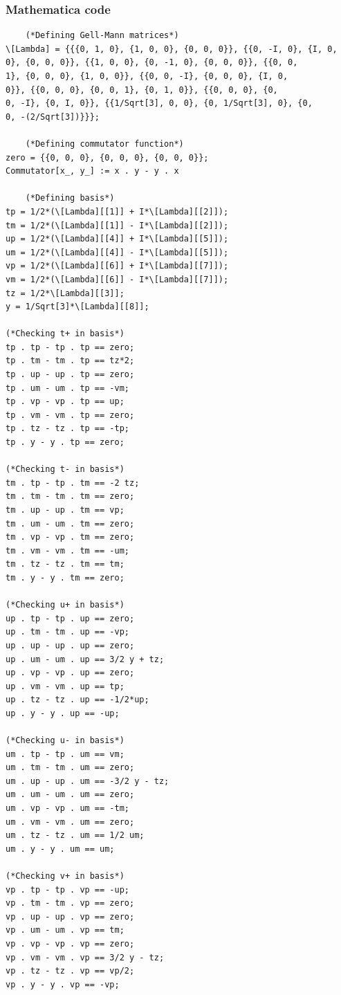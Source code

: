 \documentclass[a4paper,12pt]{article}
\begin{document}
\subsubsection*{Mathematica code}
\begin{lstlisting}
	(*Defining Gell-Mann matrices*)
\[Lambda] = {{{0, 1, 0}, {1, 0, 0}, {0, 0, 0}}, {{0, -I, 0}, {I, 0, 
0}, {0, 0, 0}}, {{1, 0, 0}, {0, -1, 0}, {0, 0, 0}}, {{0, 0, 
1}, {0, 0, 0}, {1, 0, 0}}, {{0, 0, -I}, {0, 0, 0}, {I, 0, 
0}}, {{0, 0, 0}, {0, 0, 1}, {0, 1, 0}}, {{0, 0, 0}, {0, 
0, -I}, {0, I, 0}}, {{1/Sqrt[3], 0, 0}, {0, 1/Sqrt[3], 0}, {0, 
0, -(2/Sqrt[3])}}};
	
	(*Defining commutator function*)
zero = {{0, 0, 0}, {0, 0, 0}, {0, 0, 0}};
Commutator[x_, y_] := x . y - y . x

	(*Defining basis*)
tp = 1/2*(\[Lambda][[1]] + I*\[Lambda][[2]]);
tm = 1/2*(\[Lambda][[1]] - I*\[Lambda][[2]]);
up = 1/2*(\[Lambda][[4]] + I*\[Lambda][[5]]);
um = 1/2*(\[Lambda][[4]] - I*\[Lambda][[5]]);
vp = 1/2*(\[Lambda][[6]] + I*\[Lambda][[7]]);
vm = 1/2*(\[Lambda][[6]] - I*\[Lambda][[7]]);
tz = 1/2*\[Lambda][[3]];
y = 1/Sqrt[3]*\[Lambda][[8]];

(*Checking t+ in basis*)
tp . tp - tp . tp == zero;
tp . tm - tm . tp == tz*2;
tp . up - up . tp == zero;
tp . um - um . tp == -vm;
tp . vp - vp . tp == up;
tp . vm - vm . tp == zero;
tp . tz - tz . tp == -tp;
tp . y - y . tp == zero;

(*Checking t- in basis*)
tm . tp - tp . tm == -2 tz;
tm . tm - tm . tm == zero;
tm . up - up . tm == vp;
tm . um - um . tm == zero;
tm . vp - vp . tm == zero;
tm . vm - vm . tm == -um;
tm . tz - tz . tm == tm;
tm . y - y . tm == zero;

(*Checking u+ in basis*)
up . tp - tp . up == zero;
up . tm - tm . up == -vp;
up . up - up . up == zero;
up . um - um . up == 3/2 y + tz;
up . vp - vp . up == zero;
up . vm - vm . up == tp;
up . tz - tz . up == -1/2*up;
up . y - y . up == -up;

(*Checking u- in basis*)
um . tp - tp . um == vm;
um . tm - tm . um == zero;
um . up - up . um == -3/2 y - tz;
um . um - um . um == zero;
um . vp - vp . um == -tm;
um . vm - vm . um == zero;
um . tz - tz . um == 1/2 um;
um . y - y . um == um;

(*Checking v+ in basis*)
vp . tp - tp . vp == -up;
vp . tm - tm . vp == zero;
vp . up - up . vp == zero;
vp . um - um . vp == tm;
vp . vp - vp . vp == zero;
vp . vm - vm . vp == 3/2 y - tz;
vp . tz - tz . vp == vp/2;
vp . y - y . vp == -vp;


\end{lstlisting}
\end{document}
